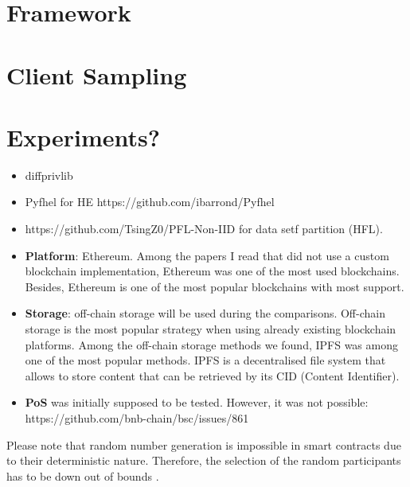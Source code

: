 

\section{Framework}

\section{Client Sampling}

\section{Experiments?}











\begin{itemize}

    \item diffprivlib \cite{diffprivlib}
    
    \item Pyfhel for HE https://github.com/ibarrond/Pyfhel
    \item https://github.com/TsingZ0/PFL-Non-IID for data setf partition (HFL).
    
    \item \textbf{Platform}: Ethereum. Among the papers I read that did not use a custom blockchain implementation, Ethereum was one of the most used blockchains. Besides, Ethereum is one of the most popular blockchains with most support.
    
    \item \textbf{Storage}: off-chain storage will be used during the comparisons. Off-chain storage is the most popular strategy when using already existing blockchain platforms. Among the off-chain storage methods we found, IPFS was among one of the most popular methods.  IPFS is a decentralised file system that allows to store content that can be retrieved by its CID (Content Identifier).
    
    \item \textbf{PoS} was initially supposed to be tested. However, it was not possible: https://github.com/bnb-chain/bsc/issues/861
\end{itemize}

    
Please note that random number generation is impossible in smart contracts due to their deterministic nature. Therefore, the selection of the random participants has to be down out of bounds \cite{9293091}. 